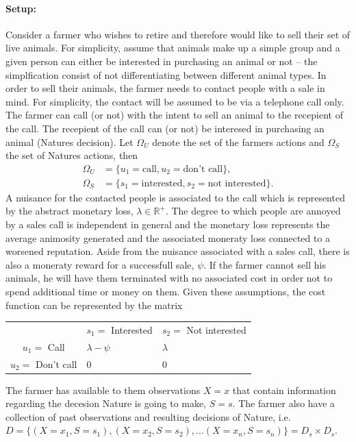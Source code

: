 \begin{example}
	\paragraph{Setup:} Consider a farmer who wishes to retire and therefore would like to sell their set of live animals. For simplicity, assume that animals make up a simple group and a given person can either be interested in purchasing an animal or not -- the simplfication consist of not differentiating between different animal types. In order to sell their animals, the farmer needs to contact people with a sale in mind. For simplicity, the contact will be assumed to be via a telephone call only. The farmer can call (or not) with the intent to sell an animal to the recepient of the call. The recepient of the call can (or not) be interesed in purchasing an animal (Natures decision). Let $\Omega_U$ denote the set of the farmers actions and $\Omega_S$ the set of Natures actions, then
	\begin{equation}
		\begin{split}
			\Omega_U &= \{u_1 = \text{call}, u_2 = \text{don't call}\},\\
			\Omega_S &= \{s_1 = \text{interested}, s_2 = \text{not interested}\}.
		\end{split}
	\end{equation}
	A nuisance for the contacted people is associated to the call which is represented by the abstract monetary loss, $\lambda\in \mathbb{R}^+$. The degree to which people are annoyed by a sales call is independent in general and the monetary loss represents the average animosity generated and the associated moneraty loss connected to a worsened reputation. Aside from the nuisance associated with a sales call, there is also a moneraty reward for a successfull sale, $\psi$.	If the farmer cannot sell his animals, he will have them terminated with no associated cost in order not to spend additional time or money on them. Given these assumptions, the cost function can be represented by the matrix
	\begin{center}
		\begin{tabular}{  c  c  c }
			& $s_1=$ Interested & $s_2=$ Not interested  \\
			\cline{2-3}
			 $u_1 =$ Call& \multicolumn{1}{|l}{$\lambda-\psi$} &\multicolumn{1}{l|}{$\lambda$}  \\
			 $u_2=$ Don't call& \multicolumn{1}{|l}{$0$} & \multicolumn{1}{l|}{0} \\
			\cline{2-3}
		\end{tabular}
	\end{center}
	The farmer has available to them observations $X=x$ that contain information regarding the decesion Nature is going to make, $S=s$. The farmer also have a collection of past observations and resulting decisions of Nature, i.e. $D= \{(X=x_1,S=s_1),(X=x_2,S=s_2),\dots (X=x_n,S=s_n)\}= D_s\times D_s$. 
	

\end{example}
